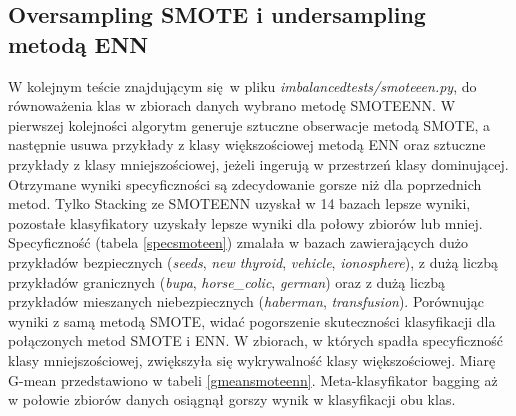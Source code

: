 \subsection{Oversampling SMOTE i undersampling metodą ENN}
W kolejnym teście znajdującym się w pliku \textit{imbalancedtests/smoteeen.py}, do równoważenia klas w zbiorach danych wybrano metodę SMOTEENN. W pierwszej kolejności algorytm generuje sztuczne obserwacje metodą SMOTE, a następnie usuwa przykłady z klasy większościowej metodą ENN oraz sztuczne przykłady z klasy mniejszościowej, jeżeli ingerują w przestrzeń klasy dominującej. Otrzymane wyniki specyficzności są zdecydowanie gorsze niż dla poprzednich metod. Tylko Stacking ze SMOTEENN uzyskał w 14 bazach lepsze wyniki, pozostałe klasyfikatory uzyskały lepsze wyniki dla połowy zbiorów lub mniej. Specyficzność (tabela \ref{specsmoteen}) zmalała w bazach zawierających dużo przykładów bezpiecznych (\textit{seeds}, \textit{new thyroid}, \textit{vehicle}, \textit{ionosphere}), z dużą liczbą przykładów granicznych (\textit{bupa}, \textit{horse\_colic}, \textit{german}) oraz z dużą liczbą przykładów mieszanych niebezpiecznych (\textit{haberman}, \textit{transfusion}). Porównując wyniki z samą metodą SMOTE, widać pogorszenie skuteczności klasyfikacji dla połączonych metod SMOTE i ENN.
W zbiorach, w których spadła specyficzność klasy mniejszościowej, zwiększyła się wykrywalność klasy większościowej. Miarę G-mean przedstawiono w tabeli \ref{gmeansmoteenn}. Meta-klasyfikator bagging aż w połowie zbiorów danych osiągnął gorszy wynik w klasyfikacji obu klas.
